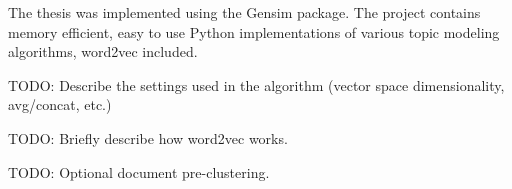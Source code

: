 The thesis was implemented using the Gensim \cite{gensim} package. The project contains memory efficient, easy to use Python implementations of various topic modeling algorithms, word2vec included.

{\color{red} TODO: Describe the settings used in the algorithm (vector space dimensionality, avg/concat, etc.)}

{\color{red} TODO: Briefly describe how word2vec works.}

{\color{red} TODO: Optional document pre-clustering.}